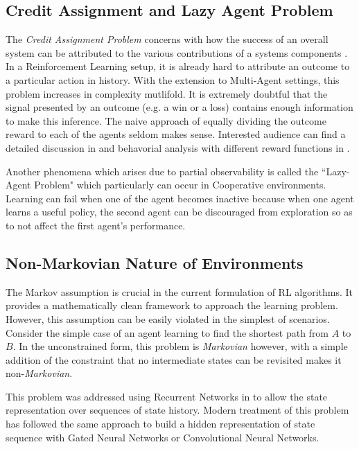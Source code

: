 \documentclass[12pt,a4paper]{article}
\begin{document}
\subsection{Credit Assignment and Lazy Agent Problem}

The \textit{Credit Assignment Problem} concerns with how the success of an overall system can
be attributed to the various contributions of a systems components \cite{Minsky:4066245}. In
a Reinforcement Learning setup, it is already hard to attribute an outcome to a particular action
in history. With the extension to Multi-Agent settings, this problem increases in complexity
mutlifold. It is extremely doubtful that the signal presented by an outcome (e.g. a win or a loss)
contains enough information to make this inference. The naive approach of equally dividing
the outcome reward to each of the agents seldom makes sense. Interested audience can find
a detailed discussion in \cite{Sutton:1984:TCA:911176} and behavorial analysis with different
reward functions in \cite{Balch97learningroles}.

Another phenomena which arises due to partial observability is called the ``Lazy-Agent Problem"
\cite{2017arXiv170605296S} which particularly can occur in Cooperative environments. Learning
can fail when one of the agent becomes inactive because when one agent learns a useful
policy, the second agent can be discouraged from exploration so as to not affect the first 
agent's performance.

\subsection{Non-Markovian Nature of Environments}

The Markov assumption is crucial in the current formulation of RL algorithms. It provides a 
mathematically clean framework to approach the learning problem. However, this
assumption can be easily violated in the simplest of scenarios. Consider the simple case of
an agent learning to find the shortest path from $A$ to $B$. In the unconstrained form, this
problem is \textit{Markovian} however, with a simple addition of the constraint that no 
intermediate states can be revisited makes it non-\textit{Markovian}. 

This problem was  addressed using Recurrent Networks in \cite{schmidhuber1991reinforcement}
to allow the state representation over sequences of state history. Modern treatment of this
problem has followed the same approach to build a hidden representation of state sequence
with Gated Neural Networks or Convolutional Neural Networks.
\end{document}
